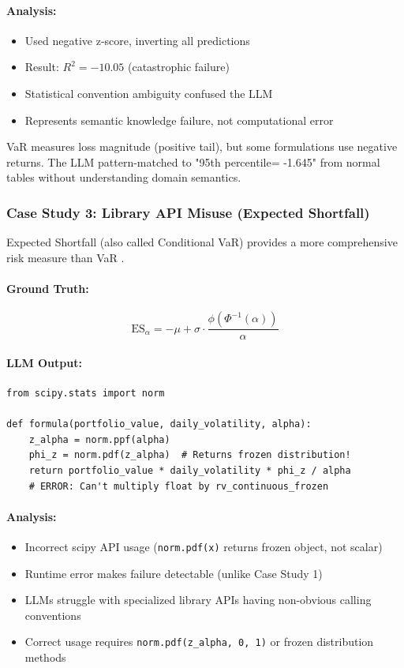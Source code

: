 \documentclass[twoside,11pt]{article}
\begin{document}
\paragraph{Analysis:}
\begin{itemize}
\item Used negative z-score, inverting all predictions
\item Result: $R^2 = -10.05$ (catastrophic failure)
\item Statistical convention ambiguity confused the LLM
\item Represents semantic knowledge failure, not computational error
\end{itemize}

VaR measures loss magnitude (positive tail), but some formulations use negative returns. The LLM pattern-matched to "95th percentile= -1.645" from normal tables without understanding domain semantics.

\subsubsection{Case Study 3: Library API Misuse (Expected Shortfall)}

Expected Shortfall (also called Conditional VaR) provides a more comprehensive risk measure than VaR \citep{embrechts1997modelling,rockafellar2000optimization}.

\paragraph{Ground Truth:}
\begin{equation}
\text{ES}_{\alpha} = -\mu + \sigma \cdot \frac{\phi(\Phi^{-1}(\alpha))}{\alpha}
\end{equation}

\paragraph{LLM Output:}
\begin{verbatim}
from scipy.stats import norm

def formula(portfolio_value, daily_volatility, alpha):
    z_alpha = norm.ppf(alpha)
    phi_z = norm.pdf(z_alpha)  # Returns frozen distribution!
    return portfolio_value * daily_volatility * phi_z / alpha
    # ERROR: Can't multiply float by rv_continuous_frozen
\end{verbatim}

\paragraph{Analysis:}
\begin{itemize}
\item Incorrect scipy API usage (\texttt{norm.pdf(x)} returns frozen object, not scalar)
\item Runtime error makes failure detectable (unlike Case Study 1)
\item LLMs struggle with specialized library APIs having non-obvious calling conventions
\item Correct usage requires \texttt{norm.pdf(z\_alpha, 0, 1)} or frozen distribution methods
\end{itemize}
\end{document}
